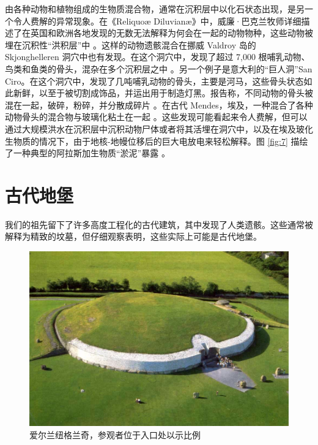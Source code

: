 \documentclass[10pt,twocolumn,letterpaper]{article}
\begin{document}
由各种动物和植物组成的生物质混合物，通常在沉积层中以化石状态出现，是另一个令人费解的异常现象。在《Reliquoæ Diluvianæ》中，威廉·巴克兰牧师详细描述了在英国和欧洲各地发现的无数无法解释为何会在一起的动物物种，这些动物被埋在沉积性“洪积层”中 \cite{58}。这样的动物遗骸混合在挪威 Valdroy 岛的 Skjonghelleren 洞穴中也有发现。在这个洞穴中，发现了超过 7,000 根哺乳动物、鸟类和鱼类的骨头，混杂在多个沉积层之中 \cite{59}。另一个例子是意大利的“巨人洞”San Ciro。在这个洞穴中，发现了几吨哺乳动物的骨头，主要是河马，这些骨头状态如此新鲜，以至于被切割成饰品，并运出用于制造灯黑。报告称，不同动物的骨头被混在一起，破碎，粉碎，并分散成碎片 \cite{60,61}。在古代 Mendes，埃及，一种混合了各种动物骨头的混合物与玻璃化粘土在一起 \cite{57}。这些发现可能看起来令人费解，但可以通过大规模洪水在沉积层中沉积动物尸体或者将其活埋在洞穴中，以及在埃及玻化生物质的情况下，由于地核-地幔位移后的巨大电放电来轻松解释。图 \ref{fig:7} 描绘了一种典型的阿拉斯加生物质“淤泥”暴露 \cite{56}。

\section{古代地堡}
我们的祖先留下了许多高度工程化的古代建筑，其中发现了人类遗骸。这些通常被解释为精致的坟墓，但仔细观察表明，这些实际上可能是古代地堡。

\begin{figure}[t]
\begin{center}
   \includegraphics[width=1\linewidth]{ww19.jpg}
\end{center}
   \caption{爱尔兰纽格兰奇，参观者位于入口处以示比例}
\label{fig:8}
\label{fig:onecol}
\end{figure}
\end{document}
